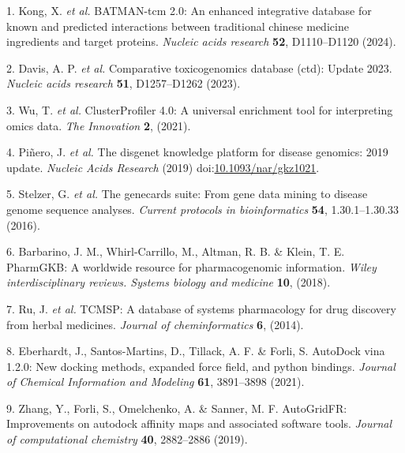 \documentclass[
]{article}
\newenvironment{cslreferences}%
  {}%
  {\par}
\begin{document}
\hypertarget{refs}{}
\begin{cslreferences}
\leavevmode\hypertarget{ref-BatmanTcm20Kong2024}{}%
1. Kong, X. \emph{et al.} BATMAN-tcm 2.0: An enhanced integrative database for known and predicted interactions between traditional chinese medicine ingredients and target proteins. \emph{Nucleic acids research} \textbf{52}, D1110--D1120 (2024).

\leavevmode\hypertarget{ref-ComparativeToxDavis2023}{}%
2. Davis, A. P. \emph{et al.} Comparative toxicogenomics database (ctd): Update 2023. \emph{Nucleic acids research} \textbf{51}, D1257--D1262 (2023).

\leavevmode\hypertarget{ref-ClusterprofilerWuTi2021}{}%
3. Wu, T. \emph{et al.} ClusterProfiler 4.0: A universal enrichment tool for interpreting omics data. \emph{The Innovation} \textbf{2}, (2021).

\leavevmode\hypertarget{ref-TheDisgenetKnPinero2019}{}%
4. Piñero, J. \emph{et al.} The disgenet knowledge platform for disease genomics: 2019 update. \emph{Nucleic Acids Research} (2019) doi:\href{https://doi.org/10.1093/nar/gkz1021}{10.1093/nar/gkz1021}.

\leavevmode\hypertarget{ref-TheGenecardsSStelze2016}{}%
5. Stelzer, G. \emph{et al.} The genecards suite: From gene data mining to disease genome sequence analyses. \emph{Current protocols in bioinformatics} \textbf{54}, 1.30.1--1.30.33 (2016).

\leavevmode\hypertarget{ref-PharmgkbAWorBarbar2018}{}%
6. Barbarino, J. M., Whirl-Carrillo, M., Altman, R. B. \& Klein, T. E. PharmGKB: A worldwide resource for pharmacogenomic information. \emph{Wiley interdisciplinary reviews. Systems biology and medicine} \textbf{10}, (2018).

\leavevmode\hypertarget{ref-TcmspADatabaRuJi2014}{}%
7. Ru, J. \emph{et al.} TCMSP: A database of systems pharmacology for drug discovery from herbal medicines. \emph{Journal of cheminformatics} \textbf{6}, (2014).

\leavevmode\hypertarget{ref-AutodockVina1Eberha2021}{}%
8. Eberhardt, J., Santos-Martins, D., Tillack, A. F. \& Forli, S. AutoDock vina 1.2.0: New docking methods, expanded force field, and python bindings. \emph{Journal of Chemical Information and Modeling} \textbf{61}, 3891--3898 (2021).

\leavevmode\hypertarget{ref-AutogridfrImpZhang2019}{}%
9. Zhang, Y., Forli, S., Omelchenko, A. \& Sanner, M. F. AutoGridFR: Improvements on autodock affinity maps and associated software tools. \emph{Journal of computational chemistry} \textbf{40}, 2882--2886 (2019).


\end{cslreferences}
\end{document}
